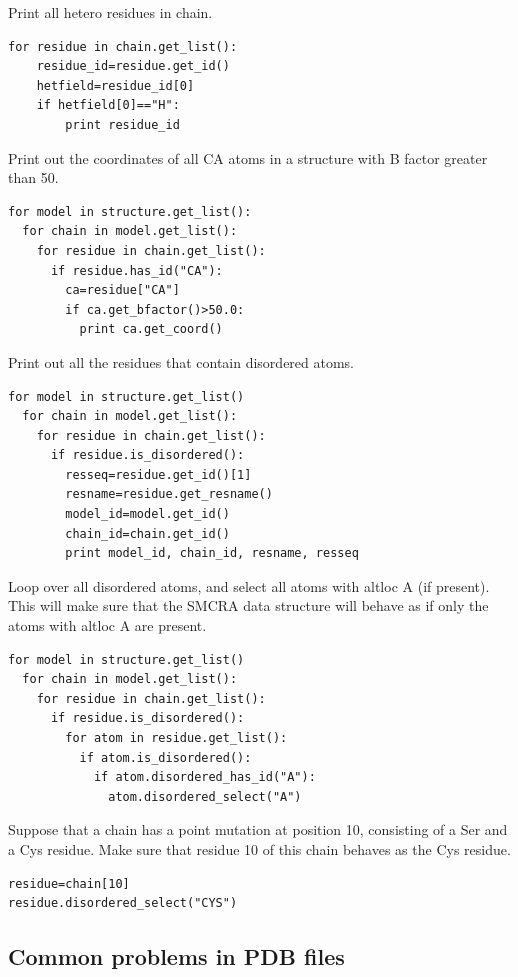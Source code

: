 \documentclass{report}
\begin{document}
Print all hetero residues in chain.

\begin{verbatim}
for residue in chain.get_list():
	residue_id=residue.get_id()
	hetfield=residue_id[0]
	if hetfield[0]=="H":
		print residue_id
\end{verbatim}

Print out the coordinates of all CA atoms in a structure with B factor greater
than 50. 

\begin{verbatim}
for model in structure.get_list():
  for chain in model.get_list():
    for residue in chain.get_list():
      if residue.has_id("CA"):
        ca=residue["CA"]
        if ca.get_bfactor()>50.0:
          print ca.get_coord()
\end{verbatim}

Print out all the residues that contain disordered atoms.

\begin{verbatim}
for model in structure.get_list()
  for chain in model.get_list():
    for residue in chain.get_list():
      if residue.is_disordered():
        resseq=residue.get_id()[1]
        resname=residue.get_resname()
        model_id=model.get_id()
        chain_id=chain.get_id()
        print model_id, chain_id, resname, resseq
\end{verbatim}

Loop over all disordered atoms, and select all atoms with altloc A (if present).
This will make sure that the SMCRA data structure will behave as if only the
atoms with altloc A are present. 

\begin{verbatim}
for model in structure.get_list()
  for chain in model.get_list():
    for residue in chain.get_list():
      if residue.is_disordered():
        for atom in residue.get_list():
          if atom.is_disordered():
            if atom.disordered_has_id("A"):
              atom.disordered_select("A")
\end{verbatim}

Suppose that a chain has a point mutation at position 10, consisting of a Ser
and a Cys residue. Make sure that residue 10 of this chain behaves as the Cys
residue.

\begin{verbatim}
residue=chain[10]
residue.disordered_select("CYS")
\end{verbatim}

\subsection{Common problems in PDB files}
\end{document}
